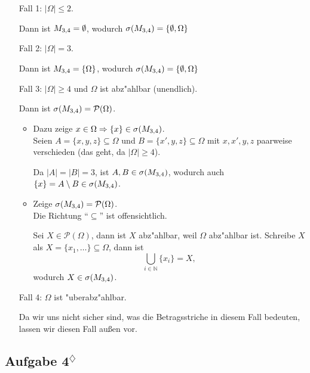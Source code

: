 \documentclass[11pt,a4paper,ngerman]{article}
\newcommand{\set}[1]{ \{ #1 \}}
\newcommand{\N}{\mathbb{N}}
\newcommand{\Rarr}{\Rightarrow}
\newcommand{\Pot}{\mathcal{P}}
\newcommand{\abs}[1]{ |#1|}
\newcommand{\marcel}{$^\diamondsuit$}
\begin{document}
\begin{itemize}
  \item[Fall 1:] $\abs{\Omega} \le 2$.

    Dann ist $M_{3,4} = \emptyset$, wodurch $\sigma(\SetM) = \set{\emptyset,
    \Omega}$

  \item[Fall 2:] $\abs{\Omega} = 3$.

    Dann ist $\SetM = \set{\Omega}$, wodurch $\sigma(\SetM) = \set{\emptyset,
    \Omega}$

  \item[Fall 3:] $\abs{\Omega} \ge 4$ und $\Omega$ ist abz"ahlbar (unendlich).

    Dann ist $\sigma(\SetM) = \Pot(\Omega)$.

    \begin{itemize}
      \item Dazu zeige $x \in \Omega \Rarr \set x \in \sigma(\SetM)$. \\

        Seien $A = \set{x, y, z} \subseteq \Omega$ und $B = \set{x', y, z}
        \subseteq \Omega$ mit $x,x',y,z$ paarweise verschieden (das geht, da
        $\abs{\Omega} \ge 4$).

        Da $\abs{A} = \abs{B} = 3$, ist $A,B \in \sigma(M_{3,4})$, wodurch auch
        $\set x = A\setminus B \in \sigma(\SetM)$.

      \item Zeige $\sigma(\SetM) = \Pot(\Omega)$. \\

        Die Richtung ``$\subseteq$'' ist offensichtlich.

        Sei $X \in \Pot(\Omega)$, dann ist $X$ abz"ahlbar, weil $\Omega$
        abz"ahlbar ist. Schreibe $X$ als $X = \set{x_1, \ldots} \subseteq
        \Omega$, dann ist \[
          \bigcup_{i\in\N} \set{x_i} = X,
        \]
        wodurch $X \in \sigma(M_{3,4})$.

    \end{itemize}

  \item[Fall 4:] $\Omega$ ist "uberabz"ahlbar.

    Da wir uns nicht sicher sind, was die Betragsstriche in diesem Fall bedeuten, lassen wir diesen Fall außen vor.

\end{itemize}

\subsection*{Aufgabe 4\marcel}
\end{document}
